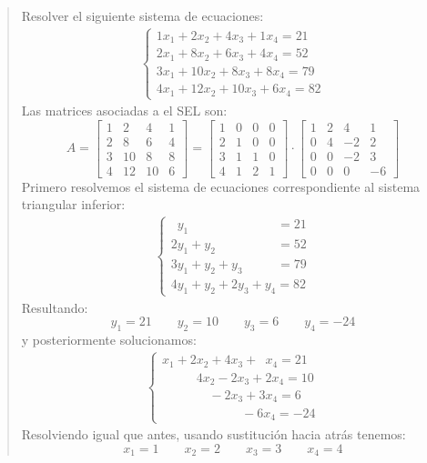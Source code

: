 \begin{quote}
  Resolver el siguiente sistema de ecuaciones:
  \begin{align*}
    \begin{cases}
      1x_1 + 2x_2 + 4x_3 + 1x_4 = 21 \\
      2x_1 + 8x_2 + 6x_3 + 4x_4 = 52 \\
      3x_1 + 10x_2 + 8x_3 + 8x_4 = 79 \\
      4x_1 + 12x_2 + 10x_3 + 6x_4 = 82
    \end{cases}
  \end{align*}
  Las matrices asociadas a el SEL son:
  \[
  A = \begin{bmatrix}
    1 & 2 & 4 & 1 \\
    2 & 8 & 6 & 4 \\
    3 & 10 & 8 & 8 \\
    4 & 12 & 10 & 6
  \end{bmatrix} = \begin{bmatrix}
    1 & 0 & 0 & 0 \\
    2 & 1 & 0 & 0 \\
    3 & 1 & 1 & 0 \\ 
    4 & 1 & 2 & 1
  \end{bmatrix} \cdot \begin{bmatrix}
    1 & 2 & 4 & 1 \\
    0 & 4 & -2 & 2 \\
    0 & 0 & -2 & 3 \\
    0 & 0 & 0 & -6
  \end{bmatrix}
  \]
  Primero resolvemos el sistema de ecuaciones correspondiente al sistema triangular inferior:
  \begin{align*}
    \begin{cases}
      \phantom{1}y_1 \phantom{ + y_2 + y_3 + y_4 00} = 21 \\
      2y_1 +y_2 \phantom{+ 0y_3 + y_4 0} = 52 \\
      3y_1 +y_2 + y_3 \phantom{+ y_4 00} = 79 \\
      4y_1 +y_2 + 2y_3 + y_4 = 82
    \end{cases}
  \end{align*}
  Resultando:
  \[y_1 = 21 \qquad y_2 = 10 \qquad y_3 = 6 \qquad y_4 = -24\]
  y posteriormente solucionamos:
    \begin{align*}
    \begin{cases}
      x_1 +2x_2 + 4x_3 + \phantom{0}x_4 = 21 \\
      \phantom{0x_1 +} 4 x_2 - 2x_3 + 2x_4 = 10 \\
      \phantom{x_1 + 0x_2} - 2x_3 + 3x_4 = 6 \\
      \phantom{x_1 + x_2 + 0x_30}-6x_4 = -24
    \end{cases}
  \end{align*}
  Resolviendo igual que antes, usando sustitución hacia atrás tenemos:
  \[x_1 = 1 \qquad x_2 = 2 \qquad x_3 = 3 \qquad x_4 = 4\]
\end{quote}


